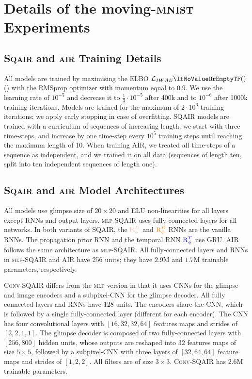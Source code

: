 \section{Details of the moving-\textsc{mnist} Experiments}
\label{app:mnist_details}

\subsection{\textsc{Sqair} and \textsc{air} Training Details}
    All models are trained by maximising the \gls{ELBO} $\loss[IWAE]$ () with the \gls{RMSprop} optimizer \citep{tieleman2012rms} with momentum equal to $0.9$. We use the learning rate of $10^{-5}$ and decrease it to $\frac{1}{3} \cdot 10^{-5}$ after 400k and to $10^{-6}$ after 1000k training iterations. Models are trained for the maximum of $2 \cdot 10^6$ training iterations; we apply early stopping in case of overfitting.
    \Gls{SQAIR} models are trained with a curriculum of sequences of increasing length: we start with three time-steps, and increase by one time-step every $10^5$ training steps until reaching the maximum length of 10.
    When training \gls{AIR}, we treated all time-steps of a sequence as independent, and we trained it on all data (sequences of length ten, split into ten independent sequences of length one). 

\subsection{\textsc{Sqair} and \textsc{air} Model Architectures}
    All models use glimpse size of $20 \times 20$ and \gls{ELU} \citep{Clevert2015elu} non-linearities for all layers except \glspl{RNN} and output layers.
    \textsc{mlp}-\gls{SQAIR} uses fully-connected layers for all networks. In both variants of \gls{SQAIR}, the $\RD$ and $\textcolor{orange}{\operatorname{R}_\phi^R}$ \glspl{RNN} are the vanilla \glspl{RNN}. The propagation prior \gls{RNN} and the temporal \gls{RNN} $\textcolor{blue}{\operatorname{R}_\phi^T}$ use \gls{GRU}. \gls{AIR} follows the same architecture as \textsc{mlp}-\gls{SQAIR}. All fully-connected layers and \glspl{RNN} in \textsc{mlp}-\gls{SQAIR} and \gls{AIR} have 256 units; they have $2.9$M and $1.7$M trainable parameters, respectively.
    
    \textsc{Conv}-\gls{SQAIR} differs from the  \textsc{mlp} version in that it uses \glspl{CNN} for the glimpse and image encoders and a subpixel-\gls{CNN} \citep{shi2016subpixel} for the glimpse decoder. All fully connected layers and \glspl{RNN} have 128 units. 
    The encoders share the \gls{CNN}, which is followed by a single fully-connected layer (different for each encoder).
    The \gls{CNN} has four convolutional layers with $[16,32,32,64]$ features maps and strides of $[2,2,1,1]$. The glimpse decoder is composed of two fully-connected layers with $[256, 800]$ hidden units, whose outputs are reshaped into $32$ features maps of size $5 \times 5$, followed by a subpixel-\gls{CNN} with three layers of $[32,64,64]$ feature maps and strides of $[1, 2, 2]$.
    All filters are of size $3 \times 3$.
    \textsc{Conv}-\gls{SQAIR} has $2.6$M trainable parameters.
    
